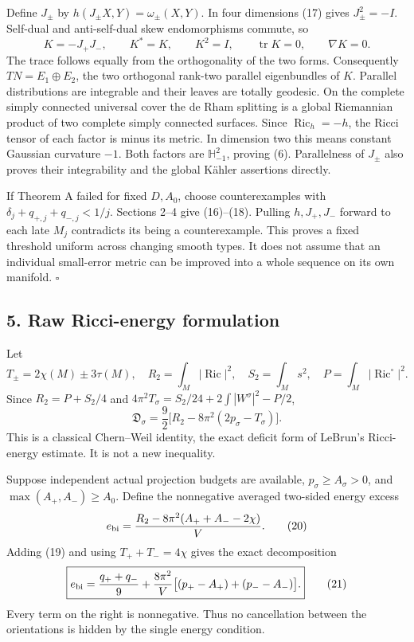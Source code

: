 \documentclass[
  11pt,
]{article}
\begin{document}
Define \(J_\pm\) by \(h(J_\pm X,Y)=\omega_\pm(X,Y)\). In four dimensions
(17) gives \(J_\pm^2=-I\). Self-dual and anti-self-dual skew
endomorphisms commute, so \[
 K=-J_+J_-,\qquad K^*=K,\qquad K^2=I,\qquad
 \operatorname{tr}K=0,\qquad\nabla K=0.
 \tag{18}
\] The trace follows equally from the orthogonality of the two forms.
Consequently \(TN=E_1\oplus E_2\), the two orthogonal rank-two parallel
eigenbundles of \(K\). Parallel distributions are integrable and their
leaves are totally geodesic. On the complete simply connected universal
cover the de Rham splitting is a global Riemannian product of two
complete simply connected surfaces. Since \(\operatorname{Ric}_h=-h\),
the Ricci tensor of each factor is minus its metric. In dimension two
this means constant Gaussian curvature \(-1\). Both factors are
\(\mathbb H^2_{-1}\), proving (6). Parallelness of \(J_\pm\) also proves
their integrability and the global Kähler assertions directly.

If Theorem A failed for fixed \(D,A_0\), choose counterexamples with
\(\delta_j+q_{+,j}+q_{-,j}<1/j\). Sections 2--4 give (16)--(18). Pulling
\(h,J_+,J_-\) forward to each late \(M_j\) contradicts its being a
counterexample. This proves a fixed threshold uniform across changing
smooth types. It does not assume that an individual small-error metric
can be improved into a whole sequence on its own manifold. \(\square\)

\hypertarget{raw-ricci-energy-formulation}{%
\subsection{5. Raw Ricci-energy
formulation}\label{raw-ricci-energy-formulation}}

Let \[
 T_\pm=2\chi(M)\pm3\tau(M),\quad
 R_2=\int_M|\operatorname{Ric}|^2,\quad
 S_2=\int_Ms^2,\quad P=\int_M|\operatorname{Ric}^{\circ}|^2.
\] Since \(R_2=P+S_2/4\) and
\(4\pi^2T_\sigma=S_2/24+2\int|W^\sigma|^2-P/2\), \[
 \boxed{
 \mathfrak D_\sigma
   =\frac92\bigl[R_2-8\pi^2(2p_\sigma-T_\sigma)\bigr].}
 \tag{19}
\] This is a classical Chern--Weil identity, the exact deficit form of
LeBrun's Ricci-energy estimate. It is not a new inequality.

Suppose independent actual projection budgets are available,
\(p_\sigma\ge A_\sigma>0\), and \(\max(A_+,A_-)\ge A_0\). Define the
nonnegative averaged two-sided energy excess \[
 e_{\rm bi}
 =\frac{R_2-8\pi^2(A_++A_--2\chi)}{V}.
 \tag{20}
\] Adding (19) and using \(T_++T_-=4\chi\) gives the exact decomposition
\[
 \boxed{
 e_{\rm bi}
 =\frac{q_++q_-}{9}
   +\frac{8\pi^2}{V}
      \bigl[(p_+-A_+)+(p_--A_-)\bigr].}
 \tag{21}
\] Every term on the right is nonnegative. Thus no cancellation between
the orientations is hidden by the single energy condition.
\end{document}
